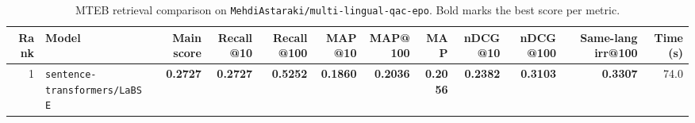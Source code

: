\begin{table}[t]
\centering
\small
\begin{tabular}{r l r r r r r r r r r r}
\hline
Rank & Model & Main score & Recall@10 & Recall@100 & MAP@10 & MAP@100 & MAP & nDCG@10 & nDCG@100 & Same-lang irr@100 & Time (s) \\
\hline
1 & \texttt{sentence-transformers/LaBSE} & \textbf{0.2727} & \textbf{0.2727} & \textbf{0.5252} & \textbf{0.1860} & \textbf{0.2036} & \textbf{0.2056} & \textbf{0.2382} & \textbf{0.3103} & \textbf{0.3307} & 74.0 \\
\hline
\end{tabular}
\caption{MTEB retrieval comparison on \texttt{MehdiAstaraki/multi-lingual-qac-epo}. Bold marks the best score per metric.}
\label{tab:mteb-model-comparison}
\end{table}
